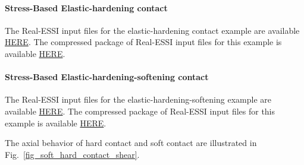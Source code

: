 \paragraph{Stress-Based Elastic-hardening contact}

The Real-ESSI input files for the elastic-hardening contact example are available 
\href{http://cml01.engr.ucdavis.edu/shortCourse/Day3/Contact_Examples/shear/SoftContact_Nonlinear_Hardening_Shear_Model}{HERE}. 
The compressed package of Real-ESSI input files for this example is available 
\href{http://cml01.engr.ucdavis.edu/shortCourse/Day3/Contact_Examples/shear/SoftContact_Nonlinear_Hardening_Shear_Model/SoftContact_Nonlinear_Hardening_Shear_Model.tgz}{HERE}. 



\paragraph{Stress-Based Elastic-hardening-softening contact}

The Real-ESSI input files for the elastic-hardening-softening example are available 
\href{http://cml01.engr.ucdavis.edu/shortCourse/Day3/Contact_Examples/shear/SoftContact_Nonlinear_Hardening_Softening_Shear_Model}{HERE}. 
The compressed package of Real-ESSI input files for this example is available 
\href{http://cml01.engr.ucdavis.edu/shortCourse/Day3/Contact_Examples/shear/SoftContact_Nonlinear_Hardening_Softening_Shear_Model/SoftContact_Nonlinear_Hardening_Softening_Shear_Model.tgz}{HERE}. 



The axial behavior of hard contact and soft contact are illustrated in Fig.~\ref{fig_soft_hard_contact_shear}.


